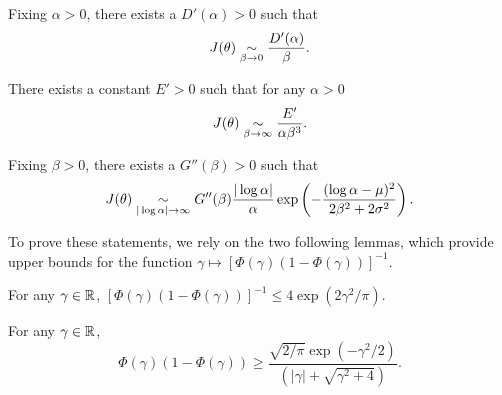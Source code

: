     \begin{prop}\label{prop:jeffb0}
        Fixing $\alpha>0$, there exists a $D'(\alpha)>0$ such that
            \begin{equation}
               J(\theta)\underset{\beta\rightarrow0}{\sim} \frac{D'(\alpha)}{\beta}.
            \end{equation}
    \end{prop}

    \begin{prop}\label{prop:jeffbinf}
        {There exists a constant $E'>0$ such that for any $\alpha>0$}
            \begin{equation}
                J(\theta)\underset{\beta\rightarrow\infty}{\sim}\frac{E'}{\alpha\beta^3}.
            \end{equation}
        \end{prop}
        
        \begin{prop}\label{prop:jeffalph}
            Fixing $\beta>0$, there exists a $G''(\beta)>0$ such that
            \begin{equation}
            J(\theta) \underset{|\log\alpha|\rightarrow\infty}{\sim} G''(\beta)\frac{|\log\alpha|}{\alpha}\exp\left(-\frac{(\log\alpha-\mu)^2}{2\beta^2+2\sigma^2}\right). 
        \end{equation}
        \end{prop}


    To prove these statements, we rely on the two following lemmas, which provide upper bounds for the function $\gamma\mapsto[\Phi(\gamma)(1-\Phi(\gamma))]^{-1}$.



     \begin{lem}\label{lem:phi(1-phi)ineq1}
        For any $\gamma\in\mathbb{R}$, $[\Phi(\gamma)(1-\Phi(\gamma))]^{-1}\leq4\exp\left(2\gamma^2/\pi\right)$.
     \end{lem}

     \begin{lem}\label{lem:phi(1-phi)ineq2} For any $\gamma\in\mathbb{R}$,
        \begin{equation}
        \Phi(\gamma) (1-\Phi(\gamma)) \geq \frac{\sqrt{2/\pi}\exp(-\gamma^2/2)}{  (|\gamma|+\sqrt{\gamma^2+4}) }. 
    \end{equation}
        
    \end{lem}



